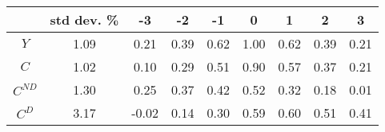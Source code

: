 \begin{tabular}{ccccccccc}
\toprule
 & std dev. \% & -3 & -2 & -1 & 0 & 1 & 2 & 3 \\
\midrule
$Y$ & 1.09 & 0.21 & 0.39 & 0.62 & 1.00 & 0.62 & 0.39 & 0.21 \\
$C$ & 1.02 & 0.10 & 0.29 & 0.51 & 0.90 & 0.57 & 0.37 & 0.21 \\
$C^{ND}$ & 1.30 & 0.25 & 0.37 & 0.42 & 0.52 & 0.32 & 0.18 & 0.01 \\
$C^{D}$ & 3.17 & -0.02 & 0.14 & 0.30 & 0.59 & 0.60 & 0.51 & 0.41 \\
\bottomrule
\end{tabular}
